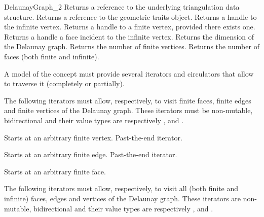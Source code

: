 \begin{ccRefConcept}{DelaunayGraph_2}
{Returns a reference to the underlying triangulation data structure.}
\ccGlue
{}
{Returns a reference to the geometric traits object.}
\ccGlue
{}
{Returns a handle to the infinite vertex.}
\ccGlue
{}
{Returns a handle to a finite vertex, provided there exists one.}
\ccGlue
{}
{Returns a handle a face incident to the infinite vertex.}
\ccGlue
{}
{Returns the dimension of the Delaunay graph.}
\ccGlue
{}
{Returns the number of finite vertices.}
\ccGlue
{}
{Returns the number of faces (both finite and infinite).}



A model of the  concept must provide several
iterators and circulators that allow to traverse it (completely or
partially).




The following iterators must allow, respectively, to visit 
finite faces,  finite edges and  finite vertices
of the Delaunay graph. These iterators must be non-mutable,
bidirectional and their value types are respectively
,  and .

{Starts at an arbitrary finite vertex.}
\ccGlue
{}
{Past-the-end iterator.}

{Starts at an arbitrary finite edge.}
\ccGlue
{}
{Past-the-end iterator.}

{Starts at an arbitrary finite face.}
\ccGlue
{}

The following iterators must allow, respectively, to visit all
(both finite and infinite) faces, edges and vertices
of the Delaunay graph. These iterators are non-mutable, bidirectional
and their value types are respectively
,  and . 


\end{ccRefConcept}
